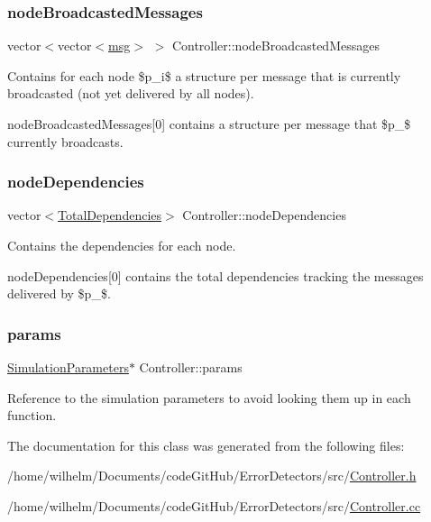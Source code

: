 \subsubsection{\texorpdfstring{node\+Broadcasted\+Messages}{nodeBroadcastedMessages}}
{\footnotesize\ttfamily vector$<$vector$<$\hyperlink{_controller_8h_afa0f3b802fbc219228f7bb97996fa558}{msg}$>$ $>$ Controller\+::node\+Broadcasted\+Messages\hspace{0.3cm}{\ttfamily [private]}}



Contains for each node \$p\+\_\+i\$ a structure per message that is currently broadcasted (not yet delivered by all nodes). 

node\+Broadcasted\+Messages\mbox{[}0\mbox{]} contains a structure per message that \$p\+\_\$ currently broadcasts. \mbox{\label{class_controller_ade3eeb8e78c5307d518e3b43967c4bac}} 
\subsubsection{\texorpdfstring{node\+Dependencies}{nodeDependencies}}
{\footnotesize\ttfamily vector$<$\hyperlink{class_total_dependencies}{Total\+Dependencies}$>$ Controller\+::node\+Dependencies\hspace{0.3cm}{\ttfamily [private]}}



Contains the dependencies for each node. 

node\+Dependencies\mbox{[}0\mbox{]} contains the total dependencies tracking the messages delivered by \$p\+\_\$. \mbox{\label{class_controller_a81d7fe43b78ef7601e6b36c3df38ce79}} 
\subsubsection{\texorpdfstring{params}{params}}
{\footnotesize\ttfamily \hyperlink{class_simulation_parameters}{Simulation\+Parameters}$\ast$ Controller\+::params\hspace{0.3cm}{\ttfamily [private]}}



Reference to the simulation parameters to avoid looking them up in each function. 



The documentation for this class was generated from the following files\+:\begin{DoxyCompactItemize}
\item 
/home/wilhelm/\+Documents/code\+Git\+Hub/\+Error\+Detectors/src/\hyperlink{_controller_8h}{Controller.\+h}\item 
/home/wilhelm/\+Documents/code\+Git\+Hub/\+Error\+Detectors/src/\hyperlink{_controller_8cc}{Controller.\+cc}\end{DoxyCompactItemize}
